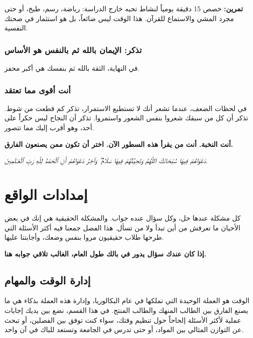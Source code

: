 \documentclass[12pt,a4paper]{book}
\newcommand{\quoteAr}[1]{%
	\begin{myquote}
		\itshape #1
	\end{myquote}
}
\newcommand{\importantAr}[1]{%
	\begin{important}
		\bfseries #1
	\end{important}
}
\newcommand{\exerciseAr}[1]{%
	\begin{exercise}
		\textbf{تمرين:} #1
	\end{exercise}
}
\begin{document}
	\exerciseAr{
		خصص 15 دقيقة يومياً لنشاط تحبه خارج الدراسة: رياضة، رسم، طبخ، أو حتى مجرد المشي والاستماع للقرآن. هذا الوقت ليس ضائعاً، بل هو استثمار في صحتك النفسية.
	}
	
	\subsection{تذكر: الإيمان بالله ثم بالنفس هو الأساس}
	في النهاية، الثقة بالله ثم بنفسك هي أكبر محفز.
	
	\subsection{ أنت أقوى مما تعتقد}
	
	في لحظات الضعف، عندما تشعر أنك لا تستطيع الاستمرار، تذكر كم قطعت من شوط. تذكر أن كل من سبقك شعروا بنفس الشعور واستمروا. تذكر أن النجاح ليس حكراً على أحد، وهو أقرب إليك مما تتصور.
	
	\importantAr{أنت النخبة. أنت من يقرأ هذه السطور الآن. اختر أن تكون ممن يصنعون الفارق.}
	
	\quoteAr{دَعْوَاهُمْ فِيهَا سُبْحَانَكَ اللَّهُمَّ وَتَحِيَّتُهُمْ فِيهَا سَلَامٌ ۖ وَآخِرُ دَعْوَاهُمْ أَنِ ٱلْحَمْدُ لِلَّهِ رَبِّ ٱلْعَـٰلَمِينَ.}
	
	
	
	
	
	\chapter{إمدادات الواقع}
	\label{chap:questions}
	
	كل مشكلة عندها حل، وكل سؤال عنده جواب. والمشكلة الحقيقية هي إنك في بعض الأحيان ما تعرفش من أين تبدأ ولا من تسأل. هذا الفصل جمعنا فيه أكثر الأسئلة التي طرحها طلاب حقيقيون مروا بنفس وضعك، وأجابتنا عليها.
	
	\importantAr{إذا كان عندك سؤال يدور في بالك طول العام، الغالب تلاقي جوابه هنا.}
	
	
	\section{إدارة الوقت والمهام}
	
	الوقت هو العملة الوحيدة التي تملكها في عام البكالوريا، وإدارة هذه العملة بذكاء هي ما يصنع الفارق بين الطالب المنهك والطالب المنتج. في هذا القسم، نضع بين يديك إجابات عملية لأكثر الأسئلة إلحاحاً حول تنظيم وقتك، سواء كنت توفق بين الفصلين، أو تبحث عن التوازن المثالي بين المواد، أو حتى تدرس في الجامعة وتستعد للباك في آن واحد.
	
\end{document}
